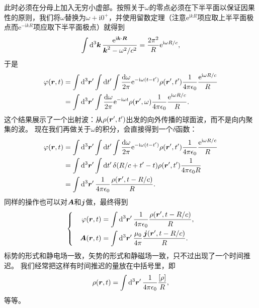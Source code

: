 \documentclass[UTF8, a4paper]{ctexart}
\newcommand*{\ee}{\mathrm{e}}
\newcommand*{\ii}{\mathrm{i}}
\newenvironment{bigcase}{\left\{\quad\begin{aligned}}{\end{aligned}\right.}
\begin{document}
此时必须在分母上加入无穷小虚部。按照关于$\omega$的零点必须在下半平面以保证因果性的原则，我们将$\omega$替换为$\omega + \ii 0^+$，并使用留数定理（注意$\ee^{\ii k R}$项应取上半平面极点而$\ee^{- \ii k R}$项应取下半平面极点）就得到
\[
    \int \dd[3]{\vb*{k}} \frac{\ee^{\ii \vb*{k} \cdot \vb*{R}}}{\vb*{k}^2 - \omega^2/c^2} = \frac{2 \pi^2}{R} \ee^{\ii \omega R / c}, 
\]
于是
\begin{equation}
    \begin{aligned}
        \varphi(\vb*{r}, t) &= \int \dd[3]{\vb*{r}'} \int \dd{t'} \int \frac{\dd{\omega}}{2\pi} \ee^{-\ii \omega (t-t')} \rho(\vb*{r}', t') \frac{1}{4\pi \epsilon_0} \frac{\ee^{\ii \omega R / c}}{R} \\
        &= \int \dd[3]{\vb*{r}'} \int \frac{\dd{\omega}}{2\pi} \ee^{- \ii \omega t} \rho(\vb*{r}', \omega) \frac{1}{4\pi \epsilon_0} \frac{\ee^{\ii \omega R / c}}{R}.
    \end{aligned}
\end{equation}
这个结果展示了一个出射波：从$\rho(\vb*{r}', t')$出发的向外传播的球面波，而不是向内聚集的波。
现在我们再做关于$\omega$的积分，会直接得到一个$\delta$函数：
\[
    \begin{aligned}
        \varphi(\vb*{r}, t) &= \int \dd[3]{\vb*{r}'} \int \dd{t'} \int \frac{\dd{\omega}}{2\pi} \ee^{-\ii \omega (t-t')} \rho(\vb*{r}', t') \frac{1}{4\pi \epsilon_0} \frac{\ee^{\ii \omega R / c}}{R} \\
        &= \int \dd[3]{\vb*{r}'} \int \dd{t'} \delta(R/c + t' - t) \rho(\vb*{r}', t') \frac{1}{4\pi \epsilon_0 R} \\
        &= \int \dd[3]{\vb*{r}'} \frac{1}{4\pi \epsilon_0} \frac{\rho(\vb*{r}', t - R / c)}{R}.
    \end{aligned}
\]
同样的操作也可以对$\vb*{A}$和$\vb*{j}$做，最终得到
\begin{equation}
    \begin{bigcase}
        \varphi(\vb*{r}, t) &= \int \dd[3]{\vb*{r}'} \frac{1}{4\pi \epsilon_0} \frac{\rho(\vb*{r}', t - R / c)}{R}, \\
        \vb*{A}(\vb*{r}, t) &= \int \dd[3]{\vb*{r}'} \frac{\mu_0}{4\pi} \frac{\vb*{j}(\vb*{r}', t - R / c)}{R}.
    \end{bigcase}
    \label{eq:general-solution-wave}
\end{equation}
标势的形式和静电场一致，矢势的形式和静磁场一致，只不过出现了一个时间推迟。
我们经常把这样有时间推迟的量放在中括号里，即
\[
    \rho(\vb*{r}, t) = \int \dd[3]{\vb*{r}'} \frac{1}{4\pi \epsilon_0} \frac{[\rho]}{R},
\]
等等。
\end{document}
